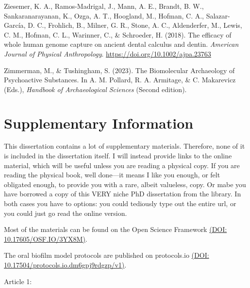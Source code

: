 \documentclass[
  b5paper,
]{book}
\newlength{\cslhangindent}
\newenvironment{CSLReferences}[2] %
 {\begin{list}{}{%
  \setlength{\itemindent}{0pt}
  \setlength{\leftmargin}{0pt}
  \setlength{\parsep}{0pt}
  \ifodd #1
   \setlength{\leftmargin}{\cslhangindent}
   \setlength{\itemindent}{-1\cslhangindent}
  \fi
  \setlength{\itemsep}{#2\baselineskip}}}
 {\end{list}}
\begin{document}
\begin{CSLReferences}{1}{0}
Ziesemer, K. A., Ramos-Madrigal, J., Mann, A. E., Brandt, B. W.,
Sankaranarayanan, K., Ozga, A. T., Hoogland, M., Hofman, C. A.,
Salazar-García, D. C., Frohlich, B., Milner, G. R., Stone, A. C.,
Aldenderfer, M., Lewis, C. M., Hofman, C. L., Warinner, C., \&
Schroeder, H. (2018). The efficacy of whole human genome capture on
ancient dental calculus and dentin. \emph{American Journal of Physical
Anthropology}. \url{https://doi.org/10.1002/ajpa.23763}

Zimmerman, M., \& Tushingham, S. (2023). The {Biomolecular Archaeology}
of {Psychoactive Substances}. In A. M. Pollard, R. A. Armitage, \& C.
Makarevicz (Eds.), \emph{Handbook of {Archaeological Sciences}} (Second
edition).

\end{CSLReferences}

\label{supplementary-information}

\chapter*{Supplementary Information}


This dissertation contains a lot of supplementary materials. Therefore,
none of it is included in the dissertation itself. I will instead
provide links to the online material, which will be useful unless you
are reading a physical copy. If you are reading the physical book, well
done---it means I like you enough, or felt obligated enough, to provide
you with a rare, albeit valueless, copy. Or mabe you have borrowed a
copy of this VERY niche PhD dissertation from the library. In both cases
you have to options: you could tediously type out the entire url, or you
could just go read the online version.

Most of the materials can be found on the Open Science Framework
\href{https://doi.org/10.17605/OSF.IO/3YX8M}{(DOI:
10.17605/OSF.IO/3YX8M)}.

The oral biofilm model protocols are published on protocols.io
\href{https://dx.doi.org/10.17504/protocols.io.dm6gpj9rdgzp/v1}{(DOI:
10.17504/protocols.io.dm6gpj9rdgzp/v1)}.

Article 1:
\end{document}
